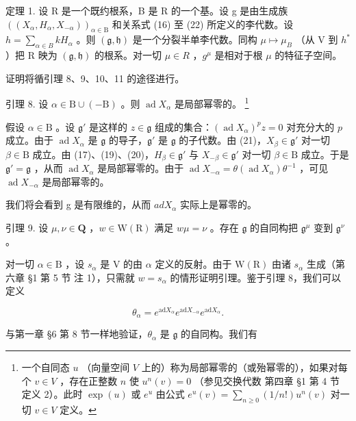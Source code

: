 定理 1. 设 R 是一个既约根系，B 是 R 的一个基。设 g 是由生成族 \(((X_{\alpha}, H_{\alpha}, X_{-\alpha}))_{\alpha \in \mathrm{B}}\) 和关系式 (16) 至 (22) 所定义的李代数。设 \(h = \sum_{\alpha \in B} kH_{\alpha}\) 。则 \((\mathfrak{g}, \mathfrak{h})\) 是一个分裂半单李代数。同构 \(\mu \mapsto \mu_{B}\) （从 V 到 \(h^{*}\) ）把 R 映为 \((\mathfrak{g}, \mathfrak{h})\) 的根系。对一切 \(\mu \in R\) ，\(g^{\mu}\) 是相对于根 \(\mu\) 的特征子空间。

证明将循引理 8、9、10、11 的途径进行。

引理 8. 设 \(\alpha \in \mathrm{B} \cup (-\mathrm{B})\) 。则 \(\operatorname{ad} X_{\alpha}\) 是局部幂零的。 \footnote{一个自同态 \(u\) （向量空间 \(V\) 上的）称为局部幂零的（或殆幂零的），如果对每个 \(v \in V\) ，存在正整数 \(n\) 使 \(u^n(v) = 0\) （参见交换代数 第四章 §1 第 4 节 定义 2）。此时 \(\exp(u)\) 或 \(e^u\) 由公式 \(e^u(v) = \sum_{n \geq 0} (1/n!)u^n(v)\) 对一切 \(v \in V\) 定义。}

假设 \(\alpha \in \mathrm{B}\) 。设 \(\mathfrak{g}'\) 是这样的 \(z \in \mathfrak{g}\) 组成的集合：\((\operatorname{ad} X_{\alpha})^p z = 0\) 对充分大的 \(p\) 成立。由于 \(\operatorname{ad} X_{\alpha}\) 是 \(\mathfrak{g}\) 的导子，\(\mathfrak{g}'\) 是 \(\mathfrak{g}\) 的子代数。由 (21)，\(X_{\beta} \in \mathfrak{g}'\) 对一切 \(\beta \in \mathrm{B}\) 成立。由 (17)、(19)、(20)，\(H_{\beta} \in \mathfrak{g}'\) 与 \(X_{-\beta} \in \mathfrak{g}'\) 对一切 \(\beta \in \mathrm{B}\) 成立。于是 \(\mathfrak{g}' = \mathfrak{g}\) ，从而 \(\operatorname{ad} X_{\alpha}\) 是局部幂零的。由于 \(\operatorname{ad} X_{-\alpha} = \theta (\operatorname{ad} X_{\alpha})\theta^{-1}\) ，可见 \(\operatorname{ad} X_{-\alpha}\) 是局部幂零的。

我们将会看到 g 是有限维的，从而 \(ad X_{\alpha}\) 实际上是幂零的。

引理 9. 设 \(\mu, \nu \in \mathbf{Q}\) ，\(w \in \mathrm{W}(\mathrm{R})\) 满足 \(w\mu = \nu\) 。存在 \(\mathfrak{g}\) 的自同构把 \(\mathfrak{g}^{\mu}\) 变到 \(\mathfrak{g}^{\nu}\) 。

对一切 \(\alpha \in \mathrm{B}\) ，设 \(s_{\alpha}\) 是 V 的由 \(\alpha\) 定义的反射。由于 \(\mathrm{W}(\mathrm{R})\) 由诸 \(s_{\alpha}\) 生成（第六章 §1 第 5 节 注 1），只需就 \(w = s_{\alpha}\) 的情形证明引理。鉴于引理 8，我们可以定义

\[
\theta_ {\alpha} = e ^ {\mathrm{ad} X _ {\alpha}} e ^ {\mathrm{ad} X _ {- \alpha}} e ^ {\mathrm{ad} X _ {\alpha}}.
\]

与第一章 §6 第 8 节一样地验证，\(\theta_{\alpha}\) 是 \(\mathfrak{g}\) 的自同构。我们有

